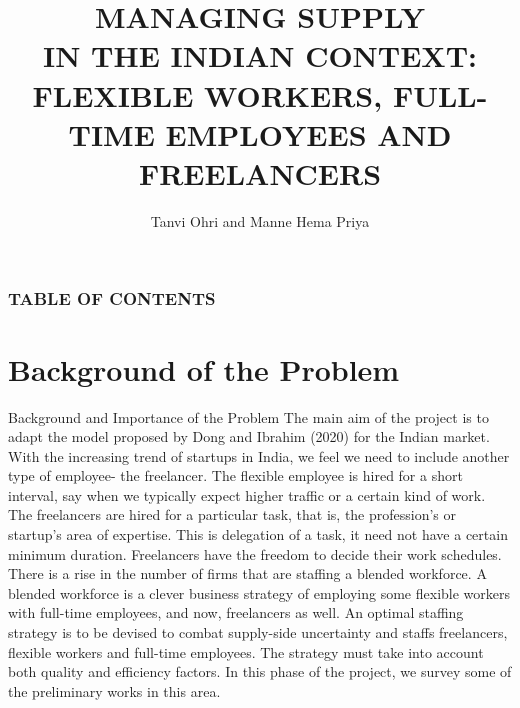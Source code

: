 \documentclass[9pt]{beamer}
\title{MANAGING SUPPLY \\ IN THE INDIAN CONTEXT:
\\FLEXIBLE WORKERS, FULL-TIME EMPLOYEES AND FREELANCERS}
\author{Tanvi Ohri and Manne Hema Priya}
\institute{}
\begin{document}
\titlepage

\begin{frame}

 \frametitle{TABLE OF CONTENTS}
 \tableofcontents
\end{frame}

\section{Background of the Problem} %
\begin{frame}{Background and Importance of the Problem}%
The main aim of the project is to adapt the model proposed by Dong and Ibrahim (2020) for the Indian market. With the increasing trend of startups in India, we feel we need to include another type of employee- the freelancer. The flexible employee is hired for a short interval, say when we typically expect higher traffic or a certain kind of work. The freelancers are hired for a particular task, that is, the profession's or startup's area of expertise. This is delegation of a task, it need not have a certain minimum duration. Freelancers have the freedom to decide their work schedules. There is a rise in the number of firms that are staffing a blended workforce. A blended workforce is a clever business strategy of employing some flexible workers with full-time employees, and now, freelancers as well. An optimal staffing strategy is to be devised to combat supply-side uncertainty and staffs freelancers, flexible workers and full-time employees. The strategy must take into account both quality and efficiency factors. In this phase of the project, we survey some of the preliminary works in this area.
    
\end{frame}
\end{document}
